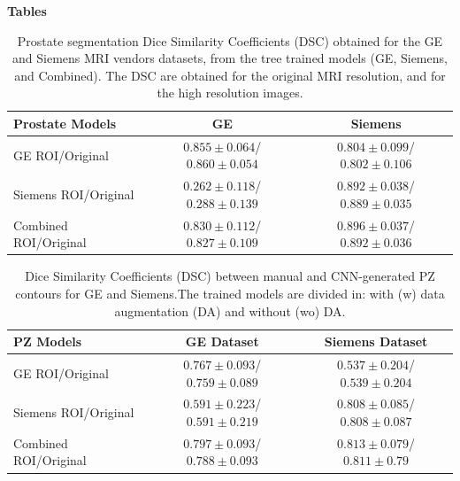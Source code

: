 \newpage
\textbf{Tables}
 \begin{table}[ht]
    \caption{Prostate segmentation Dice Similarity Coefficients (DSC) obtained for the GE and Siemens MRI vendors datasets, from the
    tree trained models (GE, Siemens, and Combined). The DSC are obtained for the original MRI resolution, and for the high resolution images.}
    \begin{tabular}{lcc}
         \hline
          \textbf{Prostate Models} & \textbf{GE} & \textbf{Siemens }\\
         \hline
         GE ROI/Original & $0.855\pm0.064$/$\mathbf{0.860\pm0.054}$ & $0.804\pm0.099$/$0.802\pm0.106$ \\
         \hline
         Siemens ROI/Original & $0.262\pm0.118$/$0.288\pm0.139$ & $0.892\pm0.038$/$0.889\pm0.035$ \\
         \hline
         Combined ROI/Original & $0.830\pm0.112$/$0.827\pm0.109$ & $\mathbf{0.896\pm0.037}$/$0.892\pm0.036$\\
         \hline
    \end{tabular}
    \label{tab:res_prost}
\end{table} 

\newpage
\begin{table}[ht]
    \caption{Dice Similarity Coefficients (DSC) between manual and CNN-generated PZ contours for GE and Siemens.The trained models are divided in: with (w) data augmentation (DA) and without (wo) DA.}
    \begin{tabular}{lcc}
         \hline
          \textbf{PZ Models} & \textbf{GE Dataset} & \textbf{Siemens Dataset}\\
         \hline
         GE ROI/Original & $0.767\pm0.093$/$0.759\pm0.089$ & $0.537\pm0.204$/$0.539\pm0.204$ \\
         \hline
         Siemens ROI/Original & $0.591\pm0.223$/$0.591\pm0.219$ & $0.808\pm0.085$/$0.808\pm0.087$ \\
         \hline
         Combined ROI/Original & $\mathbf{0.797\pm0.093}$/$0.788\pm0.093$ & $\mathbf{0.813\pm0.079}$/$0.811\pm0.79$\\
         \hline
    \end{tabular}
    \label{tab:res_pz}
\end{table}

